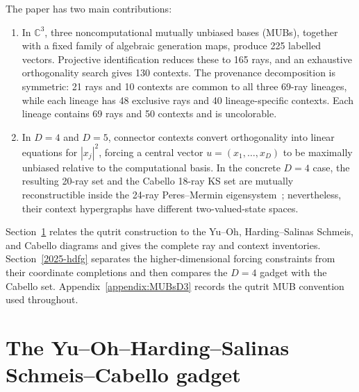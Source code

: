 \documentclass[%
  reprint,
  superscriptaddress,
  showpacs,
  showkeys,
  amsmath,amssymb,
  pra,
  longbibliography,
  floatfix,
  x11names
]{revtex4-2}
\newenvironment{revision}{\begingroup\color{revisionblue}}{\endgroup}
\begin{document}
\begin{revision}
The paper has two main contributions:
\begin{enumerate}
\item In $\mathbb{C}^3$, three noncomputational mutually unbiased bases (MUBs), together with a fixed family of algebraic generation maps, produce 225 labelled vectors.  Projective identification reduces these to 165 rays, and an exhaustive orthogonality search gives 130 contexts.  The provenance decomposition is symmetric: 21 rays and 10 contexts are common to all three 69-ray lineages, while each lineage has 48 exclusive rays and 40 lineage-specific contexts.  Each lineage contains 69 rays and 50 contexts and is uncolorable.
\item In $D=4$ and $D=5$, connector contexts convert orthogonality into linear equations for $|x_j|^2$, forcing a central vector $u=(x_1,\ldots,x_D)$ to be maximally unbiased relative to the computational basis.  In the concrete $D=4$ case, the resulting 20-ray set and the Cabello 18-ray KS set are mutually reconstructible inside the 24-ray Peres--Mermin eigensystem~\cite{peres111,mermin90b,peres-91,pavicic-2004ksafq,cabello-96}; nevertheless, their context hypergraphs have different two-valued-state spaces.
\end{enumerate}

Section~\ref{2025-yohscg} relates the qutrit construction to the Yu--Oh, Harding--Salinas Schmeis, and Cabello diagrams and gives the complete ray and context inventories.  Section~\ref{2025-hdfg} separates the higher-dimensional forcing constraints from their coordinate completions and then compares the $D=4$ gadget with the Cabello set.  Appendix~\ref{appendix:MUBsD3} records the qutrit MUB convention used throughout.
\end{revision}


\section{The Yu--Oh--Harding--Salinas Schmeis--Cabello gadget}
\label{2025-yohscg}
\end{document}
